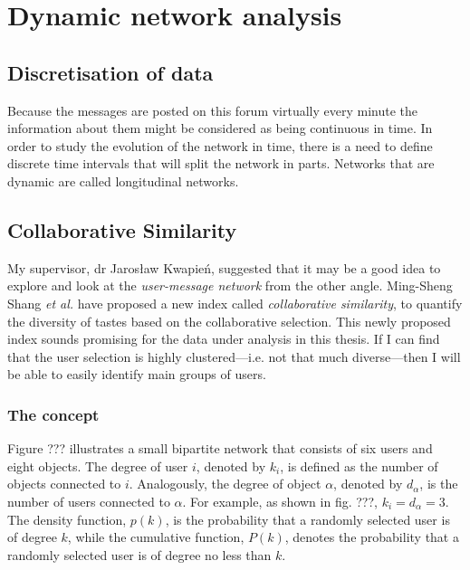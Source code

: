 \section{Dynamic network analysis}

  \subsection{Discretisation of data}
  
    Because the messages are posted on this forum virtually every minute the information about them might be considered as being continuous in time. In order to study the evolution of the network in time, there is a need to define discrete time intervals that will split the network in parts. Networks that are dynamic are called longitudinal networks.

  \subsection{Collaborative Similarity}
    
    My supervisor, dr Jarosław Kwapień, suggested that it may be a good idea to explore and look at the \emph{user-message network} from the other angle. Ming-Sheng Shang \textit{et al.} have proposed a new index called \emph{collaborative similarity}, to quantify the diversity of tastes based on the collaborative selection.\cite{Shang2010} This newly proposed index sounds promising for the data under analysis in this thesis. If I can find that the user selection is highly clustered---i.e. not that much diverse---then I will be able to easily identify main groups of users.
    
    \subsubsection{The concept}
    
      Figure ??? illustrates a small bipartite network that consists of six users and eight objects. The degree of user $i$, denoted by $k_i$, is defined as the number of objects connected to $i$. Analogously, the degree of object $\alpha$, denoted by $d_\alpha$, is the number of users connected to $\alpha$. For example, as shown in fig. ???, $k_i = d_\alpha = 3$. The density function, $p(k)$, is the probability that a randomly selected user is of degree $k$, while the cumulative function, $P(k)$, denotes the probability that a randomly selected user is of degree no less than $k$.
      
